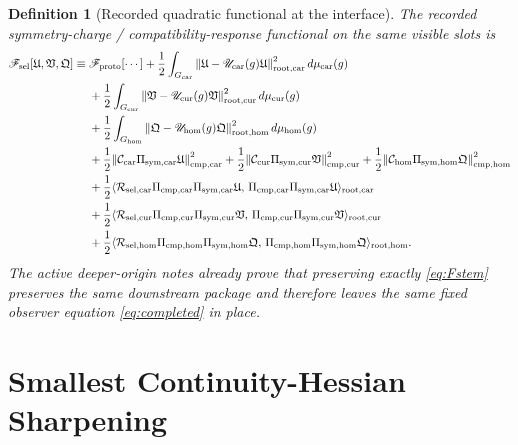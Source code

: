 \documentclass[11pt]{article}
\newcommand{\ProtoFunctional}{\mathscr F_{\mathrm{proto}}}
\newcommand{\StemFunctional}{\mathscr F_{\mathrm{sel}}}
\newcommand{\RootTensor}{\mathfrak U}
\newcommand{\RootRelabel}{\mathfrak V}
\newcommand{\RootFree}{\mathfrak Q}
\newcommand{\TensorSymProj}{\Pi_{\mathrm{sym,car}}}
\newcommand{\CurSymProj}{\Pi_{\mathrm{sym,cur}}}
\newcommand{\HomSymProj}{\Pi_{\mathrm{sym,hom}}}
\newcommand{\TensorSymGroup}{G_{\mathrm{car}}}
\newcommand{\CurSymGroup}{G_{\mathrm{cur}}}
\newcommand{\HomSymGroup}{G_{\mathrm{hom}}}
\newcommand{\TensorSymAct}{\mathscr U_{\mathrm{car}}}
\newcommand{\CurSymAct}{\mathscr U_{\mathrm{cur}}}
\newcommand{\HomSymAct}{\mathscr U_{\mathrm{hom}}}
\newcommand{\TensorCompat}{\mathcal C_{\mathrm{car}}}
\newcommand{\CurCompat}{\mathcal C_{\mathrm{cur}}}
\newcommand{\HomCompat}{\mathcal C_{\mathrm{hom}}}
\newcommand{\TensorCmpProj}{\Pi_{\mathrm{cmp,car}}}
\newcommand{\CurCmpProj}{\Pi_{\mathrm{cmp,cur}}}
\newcommand{\HomCmpProj}{\Pi_{\mathrm{cmp,hom}}}
\newcommand{\TensorResp}{\mathcal R_{\mathrm{sel,car}}}
\newcommand{\CurResp}{\mathcal R_{\mathrm{sel,cur}}}
\newcommand{\HomResp}{\mathcal R_{\mathrm{sel,hom}}}
\newtheorem{definition}{Definition}
\begin{document}
\begin{definition}[Recorded quadratic functional at the interface]
\label{def:recorded_functional}
The recorded symmetry-charge / compatibility-response functional on the same visible slots is
\begin{equation}
\begin{aligned}
\StemFunctional[\RootTensor,\RootRelabel,\RootFree]
\equiv\;
&\ProtoFunctional[\cdots]
+\frac12\int_{\TensorSymGroup}
\norm{\RootTensor-\TensorSymAct(g)\RootTensor}_{\mathrm{root,car}}^2\,
d\mu_{\mathrm{car}}(g)
\\
&+\frac12\int_{\CurSymGroup}
\norm{\RootRelabel-\CurSymAct(g)\RootRelabel}_{\mathrm{root,cur}}^2\,
d\mu_{\mathrm{cur}}(g)
\\
&+\frac12\int_{\HomSymGroup}
\norm{\RootFree-\HomSymAct(g)\RootFree}_{\mathrm{root,hom}}^2\,
d\mu_{\mathrm{hom}}(g)
\\
&+\frac12\norm{\TensorCompat\TensorSymProj\RootTensor}_{\mathrm{cmp,car}}^2
+\frac12\norm{\CurCompat\CurSymProj\RootRelabel}_{\mathrm{cmp,cur}}^2
+\frac12\norm{\HomCompat\HomSymProj\RootFree}_{\mathrm{cmp,hom}}^2
\\
&+\frac12\langle \TensorResp\TensorCmpProj\TensorSymProj\RootTensor,\,
\TensorCmpProj\TensorSymProj\RootTensor\rangle_{\mathrm{root,car}}
\\
&+\frac12\langle \CurResp\CurCmpProj\CurSymProj\RootRelabel,\,
\CurCmpProj\CurSymProj\RootRelabel\rangle_{\mathrm{root,cur}}
\\
&+\frac12\langle \HomResp\HomCmpProj\HomSymProj\RootFree,\,
\HomCmpProj\HomSymProj\RootFree\rangle_{\mathrm{root,hom}}.
\end{aligned}
\label{eq:Fstem}
\end{equation}
The active deeper-origin notes already prove that preserving exactly \eqref{eq:Fstem} preserves the same downstream package and therefore leaves the same fixed observer equation \eqref{eq:completed} in place.
\end{definition}

\section{Smallest Continuity-Hessian Sharpening}
\end{document}
